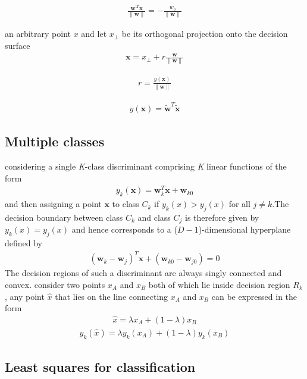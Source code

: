 \documentclass[a4paper]{article}
\begin{document}
\begin{align}
\frac{\mathbf{w^T}\mathbf{x}}{\|\mathbf{w}\|} = -\frac{w_o}{\|\mathbf{w}\|}
\end{align}

an arbitrary point $x$ and let $x_{\bot}$ be its orthogonal
 projection onto the decision surface
\begin{align}
\mathbf{x} = x_{\bot} + r \frac{\mathbf{w}}{\|\mathbf{w}\|}
\end{align}

\begin{align}
r = \frac{y(\mathbf{x})}{\|\mathbf{w}\|}
\end{align}

\begin{align}
y(\mathbf{x}) = \widetilde{{\mathbf{w}}}^T \widetilde{{\mathbf{x}}}
\end{align}

\subsection{Multiple classes}
considering a single \textit{K}-class discriminant comprising
 \textit{K} linear functions of the form
\begin{align}
y_k(\mathbf{x}) = \mathbf{w}_k^T \mathbf{x} + \mathbf{w}_{k0}
\end{align}
and then assigning a point $\mathbf{x}$ to class $C_k$ if $y_k(x) >
y_j(x)$ for all $j \neq k$.The decision boundary between class $C_k$ and
 class $C_j$ is therefore given by $y_k(x) = y_j(x)$ and hence
 corresponds to a ($\mathit{D} - 1$)-dimensional hyperplane defined by
\begin{align}
(\mathbf{w}_k - \mathbf{w}_j)^T\mathbf{x} + (\mathbf{w}_{k0} -
  \mathbf{w}_{j0}) = 0
\end{align}
The decision regions of such a discriminant are always singly
 connected and convex. consider two points $x_A$ and $x_B$ both of
 which lie inside decision region $R_k$, any point $\widehat{x}$
 that lies on the line connecting $x_A$ and $x_B$ can be expressed in the form
\begin{align}
\widehat{x} = \lambda x_A + (1 - \lambda)x_B
\end{align}
\begin{align}
y_k(\widehat{x}) = \lambda y_k(x_A) + (1-\lambda)y_k(x_B)
\end{align}

\subsection{Least squares for classification}
\end{document}

